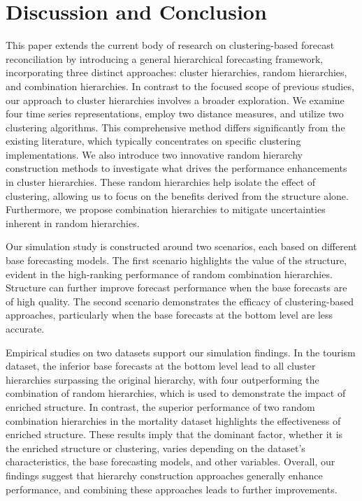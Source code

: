 \documentclass[a4paper,review,12pt,authoryear]{elsarticle}
\begin{document}



\section{Discussion and Conclusion}
\label{sec:conclusion}

This paper extends the current body of research on clustering-based forecast reconciliation by introducing a general hierarchical forecasting framework, incorporating three distinct approaches: cluster hierarchies, random hierarchies, and combination hierarchies.
In contrast to the focused scope of previous studies, our approach to cluster hierarchies involves a broader exploration. We examine four time series representations, employ two distance measures, and utilize two clustering algorithms. This comprehensive method differs significantly from the existing literature, which typically concentrates on specific clustering implementations.
We also introduce two innovative random hierarchy construction methods to investigate what drives the performance enhancements in cluster hierarchies. These random hierarchies help isolate the effect of clustering, allowing us to focus on the benefits derived from the structure alone.
Furthermore, we propose combination hierarchies to mitigate uncertainties inherent in random hierarchies.

Our simulation study is constructed around two scenarios, each based on different base forecasting models. The first scenario highlights the value of the structure, evident in the high-ranking performance of random combination hierarchies. Structure can further improve forecast performance when the base forecasts are of high quality. The second scenario demonstrates the efficacy of clustering-based approaches, particularly when the base forecasts at the bottom level are less accurate.

Empirical studies on two datasets support our simulation findings. In the tourism dataset, the inferior base forecasts at the bottom level lead to all cluster hierarchies surpassing the original hierarchy, with four outperforming the combination of random hierarchies, which is used to demonstrate the impact of enriched structure. In contrast, the superior performance of two random combination hierarchies in the mortality dataset highlights the effectiveness of enriched structure. These results imply that the dominant factor, whether it is the enriched structure or clustering, varies depending on the dataset's characteristics, the base forecasting models, and other variables. Overall, our findings suggest that hierarchy construction approaches generally enhance performance, and combining these approaches leads to further improvements.
\end{document}
